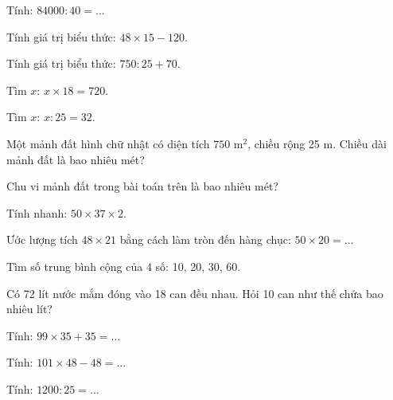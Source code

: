 \begin{ex}
Tính: $84000 : 40 = \dots$
\end{ex}

\begin{ex}
Tính giá trị biểu thức: $48 \times 15 - 120$.
\end{ex}

\begin{ex}
Tính giá trị biểu thức: $750 : 25 + 70$.
\end{ex}

\begin{ex}
Tìm $x$: $x \times 18 = 720$.
\end{ex}

\begin{ex}
Tìm $x$: $x : 25 = 32$.
\end{ex}

\begin{ex}
Một mảnh đất hình chữ nhật có diện tích $750\text{ m}^2$, chiều rộng 25 m. Chiều dài mảnh đất là bao nhiêu mét?
\end{ex}

\begin{ex}
Chu vi mảnh đất trong bài toán trên là bao nhiêu mét?
\end{ex}

\begin{ex}
Tính nhanh: $50 \times 37 \times 2$.
\end{ex}

\begin{ex}
Ước lượng tích $48 \times 21$ bằng cách làm tròn đến hàng chục: $50 \times 20 = \dots$
\end{ex}

\begin{ex}
Tìm số trung bình cộng của 4 số: 10, 20, 30, 60.
\end{ex}

\begin{ex}
Có 72 lít nước mắm đóng vào 18 can đều nhau. Hỏi 10 can như thế chứa bao nhiêu lít?
\end{ex}

\begin{ex}
Tính: $99 \times 35 + 35 = \dots$
\end{ex}

\begin{ex}
Tính: $101 \times 48 - 48 = \dots$
\end{ex}

\begin{ex}
Tính: $1200 : 25 = \dots$
\end{ex}
